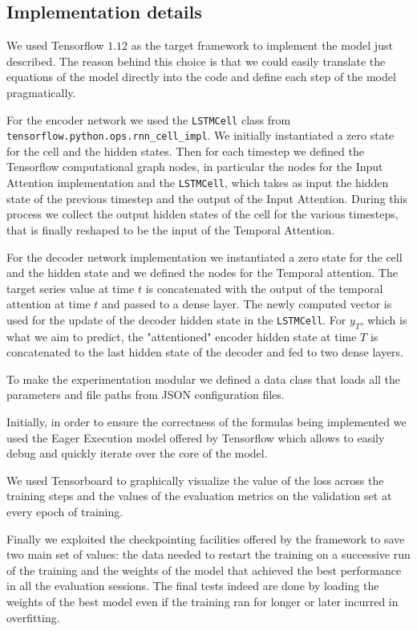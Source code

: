 \documentclass{article}
\begin{document}
\subsection{Implementation details}

We used Tensorflow $1.12$ as the target framework to implement the model just
described. The reason behind this choice is that we
could easily translate the equations of the model directly into the code and
define each step of the model pragmatically.


For the encoder network we used the \texttt{LSTMCell} class from
\texttt{tensorflow.python.ops.rnn\_cell\_impl}.
We initially instantiated a zero state for the cell and the hidden states. Then
for each timestep we defined the Tensorflow computational graph nodes, in
particular
the nodes for the Input Attention implementation and the \texttt{LSTMCell},
which takes
as input the hidden state of the previous timestep and the
output of the Input Attention. During this process we collect the output hidden
states of the cell for the various timesteps, that is finally reshaped
to be the input of the Temporal Attention.

For the decoder network implementation we instantiated a zero state for the
cell and
the hidden state and we defined the nodes for the Temporal attention. The
target series value at time $t$ is concatenated with the output of the temporal
attention
at time $t$ and passed to a dense layer. The newly computed vector is used for
the
update of the decoder hidden state in the \texttt{LSTMCell}. For $y_T$, which
is what we aim to predict, the "attentioned" encoder hidden state at time $T$
is concatenated to the last hidden state of the decoder and fed to two dense
layers.

To make the experimentation modular we defined a data class that loads all
the parameters and file paths from JSON configuration files.

Initially, in order to ensure the correctness of the formulas being implemented
we used the Eager Execution model offered by Tensorflow which allows to easily
debug and quickly iterate over the core of the model.

We used Tensorboard to graphically visualize the value of the loss across
the training steps and the values of the evaluation metrics on the validation
set
at every epoch of training.

Finally we exploited the checkpointing facilities
offered by the framework to save two main set of values: the data needed to
restart the training on a successive run of the training and the weights of the
model that achieved the best performance in all the evaluation sessions. The
final
tests indeed are done by loading the weights of the best model even if the
training ran for longer or later incurred in overfitting.
\end{document}

